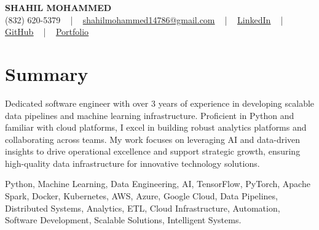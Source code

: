 \documentclass[letterpaper,10pt]{article}
\begin{document}
\begin{center}
    {\fontsize{14pt}{12pt}\selectfont \textbf{\MakeUppercase{Shahil Mohammed}}}\\ \vspace{2pt}
    \fontsize{10pt}{12pt}\selectfont (832) 620-5379 ~ | ~ \href{mailto:shahilmohammed14786@gmail.com}{shahilmohammed14786@gmail.com} ~ | ~  
    \href{https://www.linkedin.com/in/shahil-mohammed-9652931a1/}{\color{blue}\underline{LinkedIn}}  ~ | ~ 
    \href{https://github.com/freakbeast14}{\color{blue}\underline{GitHub}} ~ | ~ 
    \href{https://shahil-mohammed.netlify.app/}{\color{blue}\underline{Portfolio}}
    \vspace{-8pt}
\end{center}

\section{Summary}
\vspace{-2pt}\fontsize{8pt}{9pt}\selectfont
Dedicated software engineer with over 3 years of experience in developing scalable data pipelines and machine learning infrastructure. Proficient in Python and familiar with cloud platforms, I excel in building robust analytics platforms and collaborating across teams. My work focuses on leveraging AI and data-driven insights to drive operational excellence and support strategic growth, ensuring high-quality data infrastructure for innovative technology solutions.
\vspace{-5pt}

{\fontsize{1pt}{1pt}\selectfont\color{white}
Python, Machine Learning, Data Engineering, AI, TensorFlow, PyTorch, Apache Spark, Docker, Kubernetes, AWS, Azure, Google Cloud, Data Pipelines, Distributed Systems, Analytics, ETL, Cloud Infrastructure, Automation, Software Development, Scalable Solutions, Intelligent Systems.
}
\vspace{-8pt}

\vspace{-2pt}
\end{document}
